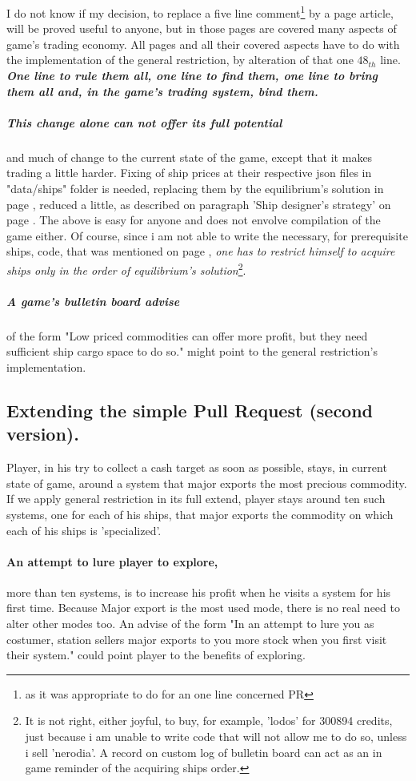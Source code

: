 \documentclass[]{article}
\begin{document}
I do not know if my decision, to replace a five line comment\footnote{as it was appropriate to do for an one line concerned PR} by a \textminus page article, will be proved useful to anyone, but in those pages are covered many aspects of game's trading economy. All  pages and all their covered aspects have to do with the implementation of the general restriction, by alteration of that one $48_{th}$ line. \textbf{\textsl{One line to rule them all, one line to find them, one line to bring them all and, in the game's trading system, bind them.}}
\subparagraph*{This change alone can not offer its full potential} and much of change to the current state of the game, except that it makes trading a little harder. Fixing of ship prices at their respective json files in "data/ships" folder is needed, replacing them by the equilibrium's solution in page \pageref{equilibriumSolution}, reduced a little, as described on paragraph 'Ship designer's strategy' on page \pageref{designers_strategy}. The above is easy for anyone and does not envolve compilation of the game either. Of course, since i am not able to write the necessary, for prerequisite ships, code, that was mentioned on page \pageref{prerequisiteShips}, \emph{one has to restrict himself to acquire ships only in the order of equilibrium's solution}\footnote{It is not right, either joyful, to buy, for example, 'lodos' for 300894 credits, just because i am unable to write code that will not allow me to do so, unless i sell 'nerodia'. A record on custom log of bulletin board can act as an in game reminder of the acquiring ships order.}.
\subparagraph*{A game's bulletin board advise} of the form \textsf{"Low priced commodities can offer more profit, but they need sufficient ship cargo space to do so."} might point to the general restriction's implementation.
\subsection{Extending the simple Pull Request (second version).}
Player, in his try to collect a cash target as soon as possible, stays, in current state of game, around a system that major exports the most precious commodity. If we apply general restriction in its full extend, player stays around ten such systems, one for each of his ships, that major exports the commodity on which each of his ships is 'specialized'. 
\paragraph{An attempt to lure player to explore,} more than ten systems, is to increase his profit when he visits a system for his first time. Because Major export is the most used mode, there is no real need to alter other modes too. An advise of the form "In an attempt to lure you as costumer, station sellers major exports to you more stock when you first visit their system." could point player to the benefits of exploring.
\end{document}
